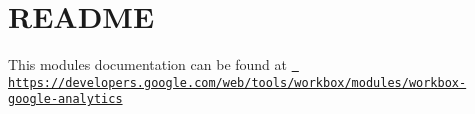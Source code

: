 \chapter{README}
\hypertarget{md_node__modules_2workbox-google-analytics_2README}{}\label{md_node__modules_2workbox-google-analytics_2README}
This module\textquotesingle{}s documentation can be found at \href{https://developers.google.com/web/tools/workbox/modules/workbox-google-analytics}{\texttt{ https\+://developers.\+google.\+com/web/tools/workbox/modules/workbox-\/google-\/analytics}} 